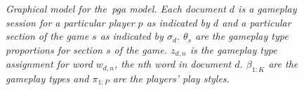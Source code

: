 \begin{figure}[H]
  \caption{\textit{Graphical model for the~\gls{pga} model. Each document $d$ is a gameplay session for a particular player $p$ as indicated by $d$ and a particular section of the game $s$ as indicated by $\sigma_{d}$. $\theta_{s}$ are the gameplay type proportions for section $s$ of the game. $z_{d,n}$ is the gameplay type assignment for word $w_{d,n}$, the nth word in document $d$. $\beta_{1:K}$ are the gameplay types and $\pi_{1:P}$ are the players' play styles.}~\cite{smith_mining_2016}}
  \label{fig:graphical-model}
\end{figure}